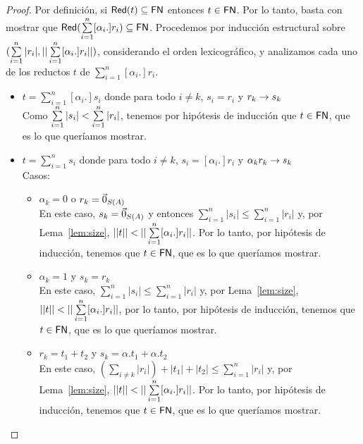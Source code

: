 \begin{proof}
  Por definición, si \( \mathsf{Red} (t) \subseteq \mathsf{FN} \) entonces \( t \in \mathsf{FN} \).
  Por lo tanto, basta con mostrar que \( \mathsf{Red} (\sum\limits_{i = 1}^{n} [\alpha_i .] r_i) \subseteq \mathsf{FN} \).
  Procedemos por inducción estructural sobre \( (\sum\limits_{i = 1}^{n} |r_i|, ||\sum\limits_{i = 1}^{n} [\alpha_i .] r_i||) \), considerando el orden lexicográfico, y analizamos cada uno de los reductos \( t \) de \( \sum\limits_{i = 1}^{n} [\alpha_i .] r_i \).
  \begin{itemize}
    \item \( t = \sum\limits_{i = 1}^n [\alpha_i .] s_i \) donde para todo \( i \neq k \), \( s_i = r_i \) y \( r_k \rightarrow s_k \)
      \\ Como \( \sum\limits_{i = 1}^n |s_i| < \sum\limits_{i = 1}^n |r_i| \), tenemos por hipótesis de inducción que \( t \in \mathsf{FN} \), que es lo que queríamos mostrar.
    \item \( t = \sum\limits_{i = 1}^n s_i \) donde para todo \( i \neq k \), \( s_i = [\alpha_i .] r_i \) y \( \alpha_k r_k \rightarrow s_k \)
      \\ Casos:
      \begin{itemize}
        \item \( \alpha_k = 0 \) o \( r_k = \vec{0}_{S (A)} \)
        \\ En este caso, \( s_k = \vec{0}_{S (A)} \)
        y entonces \( \sum\limits_{i = 1}^{n} |s_i| \leq \sum\limits_{i = 1}^{n} |r_i| \)
        y, por Lema~\ref{lem:size}, \( ||t|| < ||\sum\limits_{i = 1}^{n} [\alpha_i .] r_i|| \).
        Por lo tanto, por hipótesis de inducción, tenemos que \( t \in \mathsf{FN} \), que es lo que queríamos mostrar.
        \item \( \alpha_k = 1 \) y \( s_k = r_k \)
        \\ En este caso, \( \sum\limits_{i = 1}^{n} |s_i| \leq \sum\limits_{i = 1}^{n} |r_i| \)
        y, por Lema~\ref{lem:size}, \( ||t|| < ||\sum\limits_{i = 1}^{n} [\alpha_i .] r_i|| \),
        por lo tanto, por hipótesis de inducción, tenemos que \( t \in \mathsf{FN} \), que es lo que queríamos mostrar.
        \item \( r_k = t_1 + t_2 \) y \( s_k = \alpha . t_1 + \alpha . t_2 \)
        \\ En este caso, \( (\sum\limits_{i \neq k} |r_i|) + |t_1| + |t_2| \leq \sum\limits_{i = 1}^n |r_i| \)
        y, por Lema~\ref{lem:size}, \( ||t|| < ||\sum\limits_{i = 1}^{n} [\alpha_i .] r_i|| \).
        Por lo tanto, por hipótesis de inducción, tenemos que \( t \in \mathsf{FN} \), que es lo que queríamos mostrar.

\end{itemize}
\end{itemize}
\end{proof}
